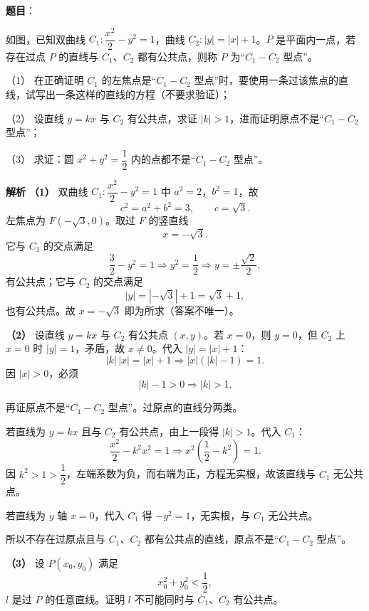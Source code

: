 \begin{answer}

\textbf{题目}：

如图，已知双曲线 $C_1:\dfrac{x^2}{2}-y^2=1$，曲线 $C_2:|y|=|x|+1$。$P$ 是平面内一点，若存在过点 $P$ 的直线与 $C_1$、$C_2$ 都有公共点，则称 $P$ 为“$C_1-C_2$ 型点”。
\nopagebreak[4]
\begin{center}\end{center}
\nopagebreak[4]
（1） 在正确证明 $C_1$ 的左焦点是“$C_1-C_2$ 型点”时，要使用一条过该焦点的直线，试写出一条这样的直线的方程（不要求验证）；

（2） 设直线 $y=kx$ 与 $C_2$ 有公共点，求证 $|k|>1$，进而证明原点不是“$C_1-C_2$ 型点”；

（3） 求证：圆 $x^2+y^2=\dfrac12$ 内的点都不是“$C_1-C_2$ 型点”。

\textbf{解析}
\textbf{（1）} 双曲线 $C_1:\dfrac{x^2}{2}-y^2=1$ 中 $a^2=2$，$b^2=1$，故
\nopagebreak[4]
\[c^2=a^2+b^2=3,\qquad c=\sqrt3.\]
左焦点为 $F(-\sqrt3,0)$。取过 $F$ 的竖直线
\nopagebreak[4]
\[x=-\sqrt3.\]
它与 $C_1$ 的交点满足
\nopagebreak[4]
\[\frac32-y^2=1\Longrightarrow y^2=\frac12\Longrightarrow y=\pm\frac{\sqrt2}{2},\]
有公共点；它与 $C_2$ 的交点满足
\nopagebreak[4]
\[|y|=|-\sqrt3|+1=\sqrt3+1,\]
也有公共点。故 $x=-\sqrt3$ 即为所求（答案不唯一）。

\textbf{（2）} 设直线 $y=kx$ 与 $C_2$ 有公共点 $(x,y)$。若 $x=0$，则 $y=0$，但 $C_2$ 上 $x=0$ 时 $|y|=1$，矛盾，故 $x\neq0$。代入 $|y|=|x|+1$：
\nopagebreak[4]
\[|k|\,|x|=|x|+1
\Longrightarrow |x|\left(|k|-1\right)=1.\]
因 $|x|>0$，必须
\nopagebreak[4]
\[|k|-1>0\Longrightarrow |k|>1.\]

再证原点不是“$C_1-C_2$ 型点”。过原点的直线分两类。

若直线为 $y=kx$ 且与 $C_2$ 有公共点，由上一段得 $|k|>1$。代入 $C_1$：
\nopagebreak[4]
\[\frac{x^2}{2}-k^2x^2=1
\Longrightarrow x^2\left(\frac12-k^2\right)=1.\]
因 $k^2>1>\dfrac12$，左端系数为负，而右端为正，方程无实根，故该直线与 $C_1$ 无公共点。

若直线为 $y$ 轴 $x=0$，代入 $C_1$ 得 $-y^2=1$，无实根，与 $C_1$ 无公共点。

所以不存在过原点且与 $C_1$、$C_2$ 都有公共点的直线，原点不是“$C_1-C_2$ 型点”。

\textbf{（3）} 设 $P(x_0,y_0)$ 满足
\nopagebreak[4]
\[x_0^2+y_0^2<\frac12,\]
$l$ 是过 $P$ 的任意直线。证明 $l$ 不可能同时与 $C_1$、$C_2$ 有公共点。


\end{answer}
